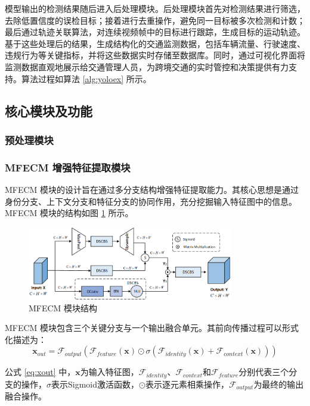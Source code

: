 \documentclass[runningheads]{llncs}
\begin{document}
模型输出的检测结果随后进入后处理模块。后处理模块首先对检测结果进行筛选，去除低置信度的误检目标；接着进行去重操作，避免同一目标被多次检测和计数；最后通过轨迹关联算法，对连续视频帧中的目标进行跟踪，生成目标的运动轨迹。基于这些处理后的结果，生成结构化的交通监测数据，包括车辆流量、行驶速度、违规行为等关键指标，并将这些数据实时存储至数据库。同时，通过可视化界面将监测数据直观地展示给交通管理人员，为跨境交通的实时管控和决策提供有力支持。算法过程如算法 \ref{alg:yoloex} 所示。



\subsection{核心模块及功能}

\subsubsection{预处理模块}


\subsubsection{MFECM 增强特征提取模块}

MFECM 模块的设计旨在通过多分支结构增强特征提取能力。其核心思想是通过身份分支、上下文分支和特征分支的协同作用，充分挖掘输入特征图中的信息。MFECM 模块的结构如图 \ref{fig:mfecm} 所示。
\begin{figure}[htbp]
    \centering
    \includegraphics[width=0.8\textwidth]{../figure/mfecm.png}
    \caption{MFECM 模块结构}
    \label{fig:mfecm}
\end{figure}

MFECM 模块包含三个关键分支与一个输出融合单元。其前向传播过程可以形式化描述为：
\begin{equation}\label{eq:xout}
\mathbf{x}_{out} = \mathcal{F}_{output} \left( \mathcal{F}_{feature}(\mathbf{x}) \odot \sigma \left( \mathcal{F}_{identity}(\mathbf{x}) + \mathcal{F}_{context}(\mathbf{x}) \right) \right)
\end{equation}

公式 \ref{eq:xout} 中，$\mathbf{x}$为输入特征图，$\mathcal{F}_{identity}$、$\mathcal{F}_{context}$和$\mathcal{F}_{feature}$分别代表三个分支的操作，$\sigma$表示Sigmoid激活函数，$\odot$表示逐元素相乘操作，$\mathcal{F}_{output}$为最终的输出融合操作。
\end{document}
